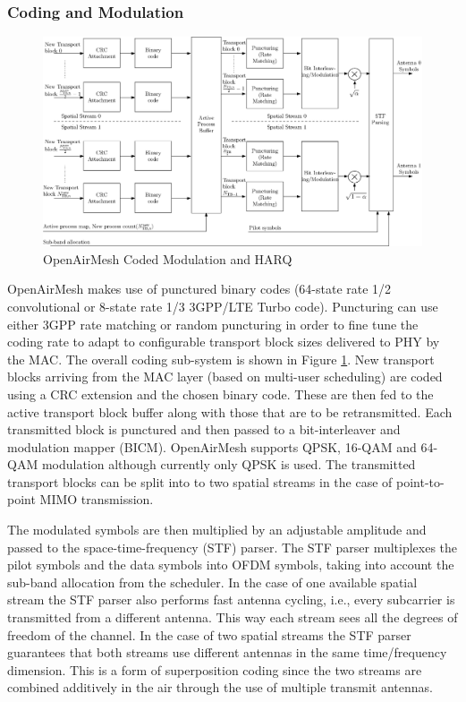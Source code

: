 \documentclass[a4paper,twocolumn,journal]{IEEEtran}
\begin{document}
\subsubsection{Coding and Modulation}
\label{sec:coding}

\begin{figure}
\centering
 \includegraphics[scale=.5]{figures/openair_coding}
\caption{OpenAirMesh Coded Modulation and HARQ}
\label{fig:coding}
\end{figure}

OpenAirMesh makes use of punctured binary codes (64-state rate 1/2 convolutional or 8-state rate 1/3 3GPP/LTE Turbo code). Puncturing can use either 3GPP rate matching or random puncturing in order to fine tune the coding rate to adapt to configurable transport block sizes delivered to PHY by the MAC.  The overall coding sub-system is shown in Figure \ref{fig:coding}. New transport blocks arriving from the MAC layer (based on multi-user scheduling) are coded using a CRC extension and the chosen binary code.  These are then fed to the active transport block buffer along with those that are to be retransmitted.  Each transmitted block is punctured and then passed to a bit-interleaver and modulation mapper (BICM).  OpenAirMesh supports QPSK, 16-QAM and 64-QAM modulation although currently only QPSK is used.  The transmitted transport blocks can be split into to two spatial streams in the case of point-to-point MIMO transmission.

The modulated symbols are then multiplied by an adjustable amplitude and passed to the space-time-frequency (STF) parser. The STF parser multiplexes the pilot symbols and the data symbols into OFDM symbols, taking into account the sub-band allocation from the scheduler. In the case of one available spatial stream the STF parser also performs fast antenna cycling, i.e., every subcarrier is transmitted from a different antenna. This way each stream sees all the degrees of freedom of the channel. In the case of two spatial streams the STF parser guarantees that both streams use different antennas in the same time/frequency dimension.  This is a form of superposition coding since the two streams are combined additively in the air through the use of multiple transmit antennas. 
\end{document}
